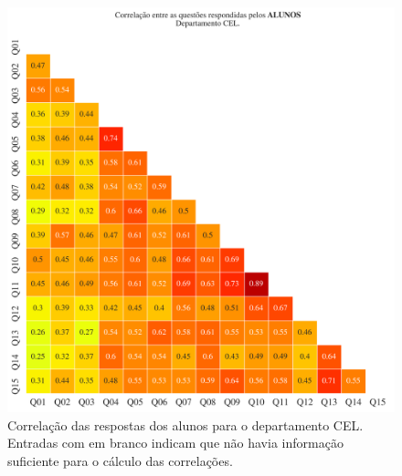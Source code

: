\documentclass[a4paper,10pt]{article}
\begin{document}
\begin{figure}[h]
\centering
\includegraphics[width=0.999\linewidth]{matriz_corr__CEL_alunos.png}
\caption{\label{fig:corr_alunos}Correlação das respostas dos alunos para o departamento CEL. Entradas com em branco indicam que não havia informação suficiente para o cálculo das correlações.}
\end{figure}
\end{document}

